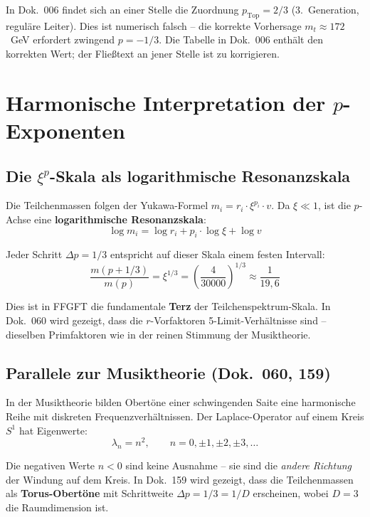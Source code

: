 In Dok.~006 findet sich an einer Stelle die Zuordnung
$p_{\text{Top}} = 2/3$ (3.~Generation, reguläre Leiter). Dies
ist numerisch falsch -- die korrekte Vorhersage $m_t \approx 172$~GeV
erfordert zwingend $p = -1/3$. Die Tabelle in Dok.~006 enthält den
korrekten Wert; der Fließtext an jener Stelle ist zu korrigieren.

\section{Harmonische Interpretation der \texorpdfstring{$p$}{p}-Exponenten}

\subsection{Die \texorpdfstring{$\xi^p$}{xi\^{}p}-Skala als logarithmische Resonanzskala}

Die Teilchenmassen folgen der Yukawa-Formel $m_i = r_i \cdot \xi^{p_i} \cdot v$.
Da $\xi \ll 1$, ist die $p$-Achse eine \textbf{logarithmische Resonanzskala}:
\begin{equation}
    \log m_i = \log r_i + p_i \cdot \log \xi + \log v
\end{equation}

Jeder Schritt $\Delta p = 1/3$ entspricht auf dieser Skala einem festen
Intervall:
\begin{equation}
    \frac{m(p + 1/3)}{m(p)} = \xi^{1/3}
    = \left(\frac{4}{30000}\right)^{1/3} \approx \frac{1}{19{,}6}
\end{equation}

Dies ist in FFGFT die fundamentale \textbf{Terz} der Teilchenspektrum-Skala.
In Dok.~060 wird gezeigt, dass die $r$-Vorfaktoren 5-Limit-Verhältnisse
sind -- dieselben Primfaktoren wie in der reinen Stimmung der Musiktheorie.

\subsection{Parallele zur Musiktheorie (Dok.~060, 159)}

In der Musiktheorie bilden Obertöne einer schwingenden Saite eine
harmonische Reihe mit diskreten Frequenzverhältnissen. Der Laplace-Operator
auf einem Kreis $S^1$ hat Eigenwerte:
\begin{equation}
    \lambda_n = n^2, \qquad n = 0, \pm 1, \pm 2, \pm 3, \ldots
\end{equation}

Die negativen Werte $n < 0$ sind keine Ausnahme -- sie sind die
\emph{andere Richtung} der Windung auf dem Kreis. In Dok.~159 wird
gezeigt, dass die Teilchenmassen als \textbf{Torus-Obertöne} mit
Schrittweite $\Delta p = 1/3 = 1/D$ erscheinen, wobei $D = 3$ die
Raumdimension ist.


